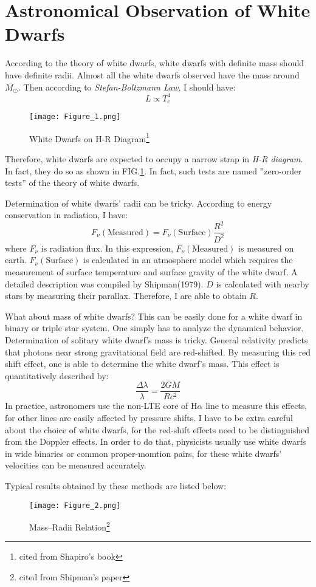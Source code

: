 \documentclass[preprint]{revtex4-1}
\begin{document}
\section{Astronomical Observation of White Dwarfs}
 According to the theory of white dwarfs, white dwarfs with definite mass should have definite radii. Almost all the white dwarfs observed have the mass around $M_{\odot}$. Then according to \emph{Stefan-Boltzmann Law}, I should have:
 \begin{equation}
 L\propto T_e^4
 \end{equation} 
 \begin{figure}
 	\centering   
 	\texttt{[image: Figure\_1.png]}  
 	\caption{White Dwarfs on H-R Diagram\footnote{cited from Shapiro's book}} 
 	\label{fig:1} 
 \end{figure}
 Therefore, white dwarfs are expected to occupy a narrow strap in \emph{H-R diagram}. In fact, they do so as shown in FIG.\ref{fig:1}. In fact, such tests are named ''zero-order tests'' of the theory of white dwarfs.\par
 Determination of white dwarfs' radii can be tricky. According to energy conservation in radiation, I have:
 \begin{equation}
 F_{\nu}(\text{Measured})=F_{\nu}(\text{Surface})\frac{R^{2}}{D^{2}}
 \end{equation}
 where $F_{\nu}$ is radiation flux. In this expression, $F_{\nu}(\text{Measured})$ is measured on earth. $F_{\nu}(\text{Surface})$ is calculated in an atmosphere model which requires the measurement of surface temperature and surface gravity of the white dwarf. A detailed description was compiled by Shipman(1979). $D$ is calculated with nearby stars by measuring their parallax. Therefore, I are able to obtain $R$.\par
 What about mass of white dwarfs? This can be easily done for a white dwarf in binary or triple star system. One simply has to analyze the dynamical behavior. Determination of solitary white dwarf's mass is tricky. General relativity predicts that photons near strong gravitational field are red-shifted. By measuring this red shift effect, one is able to determine the white dwarf's mass. This effect is quantitatively described by:
 \begin{equation}
 \frac{\Delta \lambda}{\lambda}=\frac{2GM}{Rc^2}
 \end{equation}
 In practice, astronomers use the non-LTE core of H$\alpha$ line to measure this effects, for other lines are easily affected by pressure shifts. I have to be extra careful about the choice of white dwarfs, for the red-shift effects need to be distinguished from the Doppler effects. In order to do that, physicists usually use white dwarfs in wide binaries or common proper-momtion pairs, for these white dwarfs' velocities can be measured accurately.\par
 Typical results obtained by these methods are listed below:
  \begin{figure}
  	\centering   
  	\texttt{[image: Figure\_2.png]}  
  	\caption{Mass--Radii Relation\footnote{cited from Shipman's paper}} 
  	\label{fig:2} 
  \end{figure}
  
\end{document}
